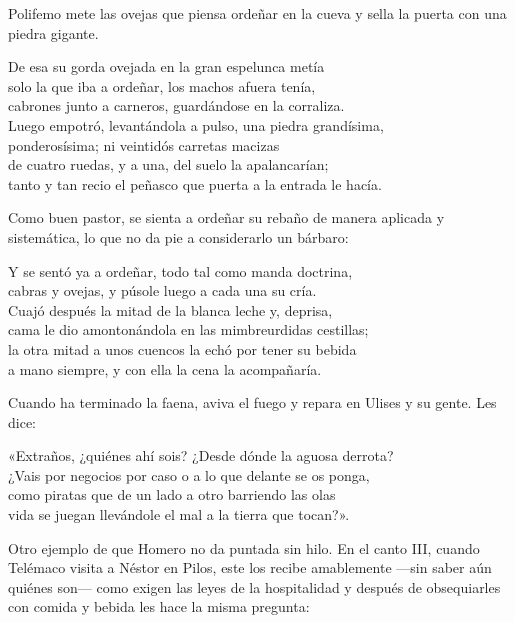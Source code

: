 Polifemo mete las ovejas que piensa ordeñar en la cueva y sella la puerta con una piedra gigante.

\begin{versocita}
De esa su gorda ovejada en la gran espelunca metía\\
solo la que iba a ordeñar, los machos afuera tenía,\\
cabrones junto a carneros, guardándose en la corraliza.\\
Luego empotró, levantándola a pulso, una piedra grandísima,\\
ponderosísima; ni veintidós carretas macizas\\
de cuatro ruedas, y a una, del suelo la apalancarían;\\
tanto y tan recio el peñasco que puerta a la entrada le hacía.
\end{versocita}

Como buen pastor, se sienta a ordeñar su rebaño de manera aplicada y sistemática, lo que no da pie a considerarlo un bárbaro:

\begin{versocita}
Y se sentó ya a ordeñar, todo tal como manda doctrina,\\
cabras y ovejas, y púsole luego a cada una su cría.\\
Cuajó después la mitad de la blanca leche y, deprisa,\\
cama le dio amontonándola en las mimbreurdidas cestillas;\\
la otra mitad a unos cuencos la echó por tener su bebida\\
a mano siempre, y con ella la cena la acompañaría.
\end{versocita}

Cuando ha terminado la faena, aviva el fuego y repara en Ulises y su gente. Les dice:

\begin{versocita}
«Extraños, ¿quiénes ahí sois? ¿Desde dónde la aguosa derrota?\\
¿Vais por negocios por caso o a lo que delante se os ponga,\\
como piratas que de un lado a otro barriendo las olas\\
vida se juegan llevándole el mal a la tierra que tocan?».
\end{versocita}

Otro ejemplo de que Homero no da puntada sin hilo. En el canto III, cuando Telémaco visita a Néstor en Pilos, este los recibe amablemente ---sin saber aún quiénes son--- como exigen las leyes de la hospitalidad y después de obsequiarles con comida y bebida les hace la misma pregunta:

